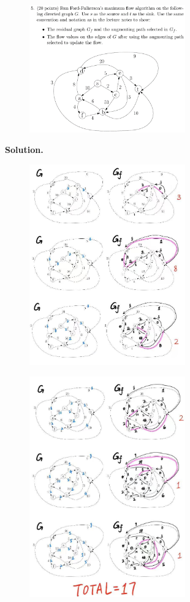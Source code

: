 \documentclass[10pt]{article}
\begin{document}
\newpage

\begin{figure}[h]
	\centering
	\includegraphics[width=0.6\textwidth]{hw4-5}
\end{figure}

\newpage
\textbf{Solution.}
\begin{figure}[H]
	\centering
	\includegraphics[width=0.6\textwidth]{hw4-5-ans(1)}
\end{figure}
\begin{figure}[H]
	\centering
	\includegraphics[width=0.6\textwidth]{hw4-5-ans(2)}
\end{figure}
\end{document}
